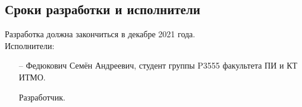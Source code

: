 \subsection{Сроки разработки и исполнители}
Разработка должна закончиться в декабре 2021 года.\\

Исполнители:
\begin{itemize}
    \item[--] Федюкович Семён Андреевич, студент группы P3555 факультета ПИ и КТ ИТМО.

    Разработчик.
\end{itemize}